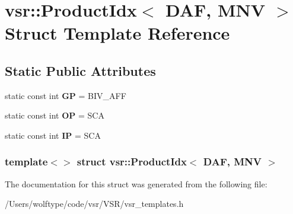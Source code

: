 \hypertarget{structvsr_1_1_product_idx_3_01_d_a_f_00_01_m_n_v_01_4}{\section{vsr\-:\-:Product\-Idx$<$ D\-A\-F, M\-N\-V $>$ Struct Template Reference}
\label{structvsr_1_1_product_idx_3_01_d_a_f_00_01_m_n_v_01_4}
}
\subsection*{Static Public Attributes}
\begin{DoxyCompactItemize}
\item 
\hypertarget{structvsr_1_1_product_idx_3_01_d_a_f_00_01_m_n_v_01_4_a2931a8344ea6e7fc2bce85972ac542dd}{static const int {\bfseries G\-P} = B\-I\-V\-\_\-\-A\-F\-F}\label{structvsr_1_1_product_idx_3_01_d_a_f_00_01_m_n_v_01_4_a2931a8344ea6e7fc2bce85972ac542dd}

\item 
\hypertarget{structvsr_1_1_product_idx_3_01_d_a_f_00_01_m_n_v_01_4_a0846dfa554e8344c5a5a44569832d74a}{static const int {\bfseries O\-P} = S\-C\-A}\label{structvsr_1_1_product_idx_3_01_d_a_f_00_01_m_n_v_01_4_a0846dfa554e8344c5a5a44569832d74a}

\item 
\hypertarget{structvsr_1_1_product_idx_3_01_d_a_f_00_01_m_n_v_01_4_a7cecb3e328b2272992ea8dad3ed03024}{static const int {\bfseries I\-P} = S\-C\-A}\label{structvsr_1_1_product_idx_3_01_d_a_f_00_01_m_n_v_01_4_a7cecb3e328b2272992ea8dad3ed03024}

\end{DoxyCompactItemize}
\subsubsection*{template$<$$>$ struct vsr\-::\-Product\-Idx$<$ D\-A\-F, M\-N\-V $>$}



The documentation for this struct was generated from the following file\-:\begin{DoxyCompactItemize}
\item 
/\-Users/wolftype/code/vsr/\-V\-S\-R/vsr\-\_\-templates.\-h\end{DoxyCompactItemize}
